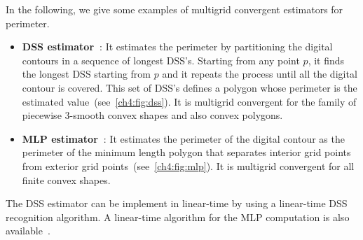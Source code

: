 In the following, we give some examples of multigrid convergent estimators for perimeter.

\begin{itemize}
	\item[]{\textbf{DSS estimator~\cite{kovalevsky92theoretical}}: It estimates the perimeter by partitioning the digital contours in a sequence of longest DSS's. Starting from any point $p$, it finds the longest DSS starting from $p$ and it repeats the process until all the digital contour is covered. This set of DSS's defines a polygon whose perimeter is the estimated value~(see~\cref{ch4:fig:dss}). It is multigrid convergent for the family of piecewise $3$-smooth convex shapes and also convex polygons.}
	\item[]{\textbf{MLP estimator~\cite{sloboda98approximation}}: It estimates the perimeter of the digital contour as the perimeter of the minimum length polygon that separates interior grid points from exterior grid points~(see~\cref{ch4:fig:mlp}). It is multigrid convergent for all finite convex shapes.}
\end{itemize}

The DSS estimator can be implement in linear-time by using a linear-time DSS recognition algorithm. A linear-time algorithm for the MLP computation is also available~\cite{provenccal09two}.

